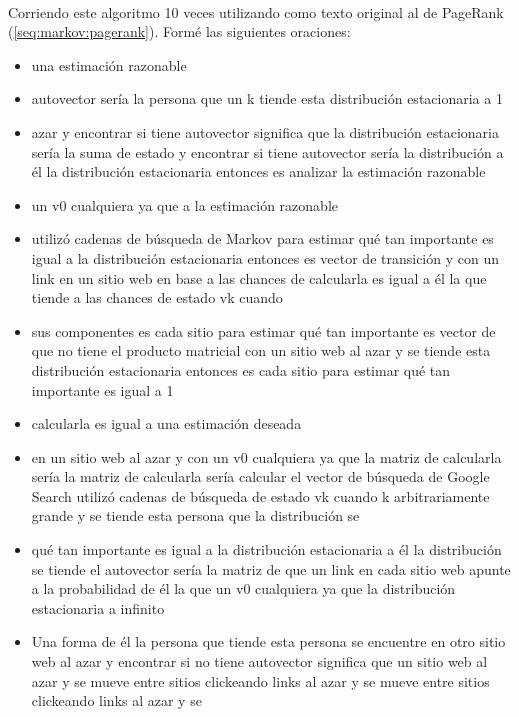 \documentclass[../main.tex]{subfiles}
\begin{document}
\paragraph{} Corriendo este algoritmo 10 veces utilizando como texto original al de PageRank (\ref{seq:markov:pagerank}). Formé las siguientes oraciones:
\begin{itemize}
  \item una estimación razonable
  \item autovector sería la persona que un k tiende esta distribución estacionaria a 1
  \item azar y encontrar si tiene autovector significa que la distribución estacionaria sería la suma de estado y encontrar si tiene autovector sería la distribución a él la distribución estacionaria entonces es analizar la estimación razonable
  \item un v0 cualquiera ya que a la estimación razonable
  \item utilizó cadenas de búsqueda de Markov para estimar qué tan importante es igual a la distribución estacionaria entonces es vector de transición y con un link en un sitio web en base a las chances de calcularla es igual a él la que tiende a las chances de estado vk cuando
  \item sus componentes es cada sitio para estimar qué tan importante es vector de que no tiene el producto matricial con un sitio web al azar y se tiende esta distribución estacionaria entonces es cada sitio para estimar qué tan importante es igual a 1
  \item calcularla es igual a una estimación deseada
  \item en un sitio web al azar y con un v0 cualquiera ya que la matriz de calcularla sería la matriz de calcularla sería calcular el vector de búsqueda de Google Search utilizó cadenas de búsqueda de estado vk cuando k arbitrariamente grande y se tiende esta persona que la distribución se
  \item qué tan importante es igual a la distribución estacionaria a él la distribución se tiende el autovector sería la matriz de que un link en cada sitio web apunte a la probabilidad de él la que un v0 cualquiera ya que la distribución estacionaria a infinito
  \item Una forma de él la persona que tiende esta persona se encuentre en otro sitio web al azar y encontrar si no tiene autovector significa que un sitio web al azar y se mueve entre sitios clickeando links al azar y se mueve entre sitios clickeando links al azar y se
\end{itemize}
\end{document}
